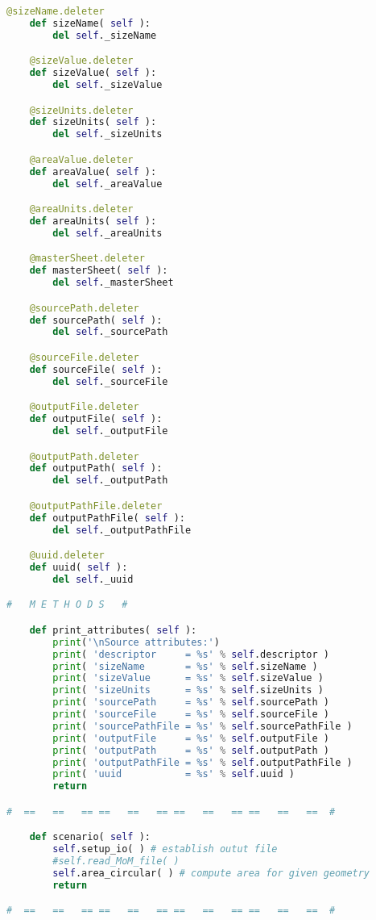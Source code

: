 {{\begin{lstlisting}[language=Python]
    @sizeName.deleter
    def sizeName( self ):
        del self._sizeName

    @sizeValue.deleter
    def sizeValue( self ):
        del self._sizeValue

    @sizeUnits.deleter
    def sizeUnits( self ):
        del self._sizeUnits

    @areaValue.deleter
    def areaValue( self ):
        del self._areaValue

    @areaUnits.deleter
    def areaUnits( self ):
        del self._areaUnits

    @masterSheet.deleter
    def masterSheet( self ):
        del self._masterSheet

    @sourcePath.deleter
    def sourcePath( self ):
        del self._sourcePath

    @sourceFile.deleter
    def sourceFile( self ):
        del self._sourceFile

    @outputFile.deleter
    def outputFile( self ):
        del self._outputFile

    @outputPath.deleter
    def outputPath( self ):
        del self._outputPath

    @outputPathFile.deleter
    def outputPathFile( self ):
        del self._outputPathFile

    @uuid.deleter
    def uuid( self ):
        del self._uuid

#   M E T H O D S   #

    def print_attributes( self ):
        print('\nSource attributes:')
        print( 'descriptor     = %s' % self.descriptor )
        print( 'sizeName       = %s' % self.sizeName )
        print( 'sizeValue      = %s' % self.sizeValue )
        print( 'sizeUnits      = %s' % self.sizeUnits )
        print( 'sourcePath     = %s' % self.sourcePath )
        print( 'sourceFile     = %s' % self.sourceFile )
        print( 'sourcePathFile = %s' % self.sourcePathFile )
        print( 'outputFile     = %s' % self.outputFile )
        print( 'outputPath     = %s' % self.outputPath )
        print( 'outputPathFile = %s' % self.outputPathFile )
        print( 'uuid           = %s' % self.uuid )
        return

#  ==   ==   == ==   ==   == ==   ==   == ==   ==   ==  #

    def scenario( self ):
        self.setup_io( ) # establish outut file
        #self.read_MoM_file( )
        self.area_circular( ) # compute area for given geometry
        return

#  ==   ==   == ==   ==   == ==   ==   == ==   ==   ==  #


\end{lstlisting}}}
